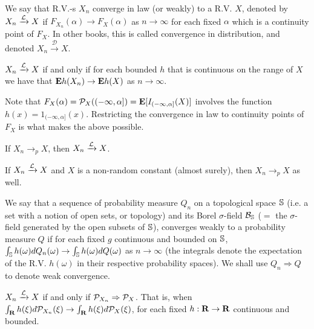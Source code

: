 \begin{definition*} 
We say that R.V.-s $X_n$ converge in law (or weakly) to a R.V. $X$, denoted by
$X_n \xrightarrow{\mathcal{L}} X$ if $F_{X_n} (\alpha) \rightarrow F_X (\alpha)$ as $n
\rightarrow \infty$ for each fixed $\alpha$ which is a continuity point of
$F_X$. In other books, this is called convergence in distribution, and denoted
$X_n \xrightarrow{\mathcal{D}} X$.
\end{definition*} 

\begin{proposition*} 
$X_n \xrightarrow{\mathcal{L}} X$ if and only if for each bounded $h$ that is continuous
on the range of $X$ we have that $\mathbf{E} h(X_n) \rightarrow \mathbf{E} h(X)$ as $n
\rightarrow \infty$.
\end{proposition*} 

\begin{remark*} 
Note that $F_X(\alpha) = \mathcal{P}_X ((-\infty, \alpha]) = \mathbf{E}[I_{(-\infty, \alpha]}
(X)]$ involves the function $h(x) = 1_{(-\infty, \alpha]}(x)$. Restricting the
convergence in law to continuity points of $F_X$ is what makes the above
possible.
\end{remark*} 

\begin{proposition*} 
If $X_n \rightarrow_p X$, then $X_n \xrightarrow{\mathcal{L}} X$.
\end{proposition*} 

\begin{proposition*} 
If $X_n \xrightarrow{\mathcal{L}} X$ and $X$ is a non-random constant (almost surely),
then $X_n \rightarrow_p X$ as well.
\end{proposition*} 

\begin{definition*} 
We say that a sequence of probability measure $Q_n$ on a topological space $\mathbb{S}$
(i.e. a set with a notion of open sets, or topology) and its Borel
$\sigma$-field $\mathcal{B}_{\mathbb{S}}$ ($ = $ the $\sigma$-field generated by the open subsets
of $\mathbb{S}$), converges weakly to a probability measure $Q$ if for each fixed $g$
continuous and bounded on $\mathbb{S}$, $\int_{\mathbb{S}} h(\omega) dQ_n(\omega) \rightarrow
\int_{\mathbb{S}} h(\omega) dQ(\omega)$ as $n \rightarrow \infty$ (the integrals denote
the expectation of the R.V. $h(\omega)$ in their respective probability spaces).
We shall use $Q_n \Rightarrow Q$ to denote weak convergence.
\end{definition*} 

\begin{example*} 
$X_n \xrightarrow{\mathcal{L}} X$ if and only if $\mathcal{P}_{X_n} \Rightarrow \mathcal{P}_X$. That
is, when $\int_{\mathbf{R}} h(\xi) d\mathcal{P}_{X_n} (\xi) \rightarrow \int_{\mathbf{R}} h(\xi)
d\mathcal{P}_X(\xi)$, for each fixed $h: \mathbf{R} \rightarrow \mathbf{R}$ continuous and bounded.
\end{example*} 


